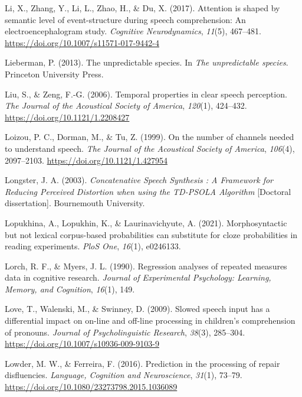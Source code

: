 \documentclass[a4paper, nobind]{templates/ociamthesis}
\newlength{\cslhangindent}
\newenvironment{CSLReferences}[2] %
 {%
  \setlength{\parindent}{0pt}
  \ifodd #1
  \let\oldpar\par
  \def\par{\hangindent=\cslhangindent\oldpar}
  \fi
  \setlength{\parskip}{1mm}
  \setlength{\baselineskip}{6mm}
 }%
 {}
\begin{document}
\begin{CSLReferences}{1}{0}
\leavevmode{}%
Li, X., Zhang, Y., Li, L., Zhao, H., \& Du, X. (2017). {Attention is shaped by semantic level of event-structure during speech comprehension: An electroencephalogram study}. \emph{Cognitive Neurodynamics}, \emph{11}(5), 467--481. \url{https://doi.org/10.1007/s11571-017-9442-4}

\leavevmode{}%
Lieberman, P. (2013). The unpredictable species. In \emph{The unpredictable species}. Princeton University Press.

\leavevmode{}%
Liu, S., \& Zeng, F.-G. (2006). {Temporal properties in clear speech perception}. \emph{The Journal of the Acoustical Society of America}, \emph{120}(1), 424--432. \url{https://doi.org/10.1121/1.2208427}

\leavevmode{}%
Loizou, P. C., Dorman, M., \& Tu, Z. (1999). On the number of channels needed to understand speech. \emph{The Journal of the Acoustical Society of America}, \emph{106}(4), 2097--2103. \url{https://doi.org/10.1121/1.427954}

\leavevmode{}%
Longster, J. A. (2003). \emph{{Concatenative Speech Synthesis : A Framework for Reducing Perceived Distortion when using the TD-PSOLA Algorithm}} {[}Doctoral dissertation{]}. Bournemouth University.

\leavevmode{}%
Lopukhina, A., Lopukhin, K., \& Laurinavichyute, A. (2021). Morphosyntactic but not lexical corpus-based probabilities can substitute for cloze probabilities in reading experiments. \emph{PloS One}, \emph{16}(1), e0246133.

\leavevmode{}%
Lorch, R. F., \& Myers, J. L. (1990). Regression analyses of repeated measures data in cognitive research. \emph{Journal of Experimental Psychology: Learning, Memory, and Cognition}, \emph{16}(1), 149.

\leavevmode{}%
Love, T., Walenski, M., \& Swinney, D. (2009). {Slowed speech input has a differential impact on on-line and off-line processing in children's comprehension of pronouns}. \emph{Journal of Psycholinguistic Research}, \emph{38}(3), 285--304. \url{https://doi.org/10.1007/s10936-009-9103-9}

\leavevmode{}%
Lowder, M. W., \& Ferreira, F. (2016). {Prediction in the processing of repair disfluencies}. \emph{Language, Cognition and Neuroscience}, \emph{31}(1), 73--79. \url{https://doi.org/10.1080/23273798.2015.1036089}


\end{CSLReferences}
\end{document}
